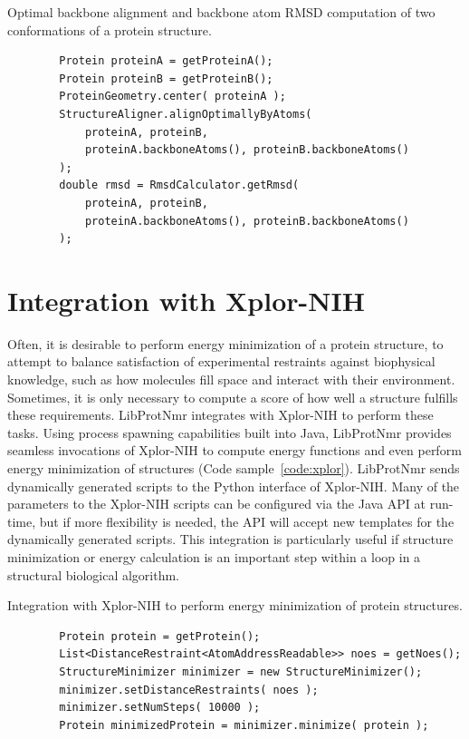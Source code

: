 \documentclass[11pt]{article}
\newcommand{\software}[1]{{\sc #1}}
\newcommand{\coderef}[1]{Code sample~\ref{#1}}
\newenvironment{codesample}
{
\begin{codesamplefloat}
\centering
\RecustomVerbatimEnvironment{Verbatim}{BVerbatim}{}
\vspace{0.1in}
}{
\end{codesamplefloat}
}
\newcommand{\libprotnmr}{\software{LibProtNmr}}
\begin{document}
\begin{codesample}
	\caption{
		Optimal backbone alignment and backbone atom RMSD computation of two conformations of a protein structure.
	}
	\begin{verbatim}
		Protein proteinA = getProteinA();
		Protein proteinB = getProteinB();
		ProteinGeometry.center( proteinA );
		StructureAligner.alignOptimallyByAtoms(
			proteinA, proteinB,
			proteinA.backboneAtoms(), proteinB.backboneAtoms()
		);
		double rmsd = RmsdCalculator.getRmsd(
			proteinA, proteinB,
			proteinA.backboneAtoms(), proteinB.backboneAtoms()
		);
	\end{verbatim}
	\label{code:proteinAnalysis}
\end{codesample}


\section{Integration with Xplor-NIH}

Often, it is desirable to perform energy minimization of a protein structure, to attempt to balance satisfaction of experimental restraints against biophysical knowledge, such as how molecules fill space and interact with their environment. Sometimes, it is only necessary to compute a score of how well a structure fulfills these requirements. {\libprotnmr} integrates with Xplor-NIH to perform these tasks. Using process spawning capabilities built into Java, {\libprotnmr} provides seamless invocations of Xplor-NIH to compute energy functions and even perform energy minimization of structures (\coderef{code:xplor}). {\libprotnmr} sends dynamically generated scripts to the Python interface of Xplor-NIH. Many of the parameters to the Xplor-NIH scripts can be configured via the Java API at run-time, but if more flexibility is needed, the API will accept new templates for the dynamically generated scripts. This integration is particularly useful if structure minimization or energy calculation is an important step within a loop in a structural biological algorithm.

\begin{codesample}
	\caption{
		Integration with Xplor-NIH to perform energy minimization of protein structures.
	}
	\begin{verbatim}
		Protein protein = getProtein();
		List<DistanceRestraint<AtomAddressReadable>> noes = getNoes();
		StructureMinimizer minimizer = new StructureMinimizer();
		minimizer.setDistanceRestraints( noes );
		minimizer.setNumSteps( 10000 );
		Protein minimizedProtein = minimizer.minimize( protein );
	\end{verbatim}
	\label{code:xplor}
\end{codesample}
\end{document}
